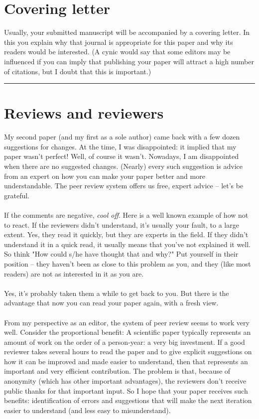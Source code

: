 \documentclass[a4paper,12pt]{article}
\begin{document}
\section{Covering letter}
Usually, your submitted manuscript will be accompanied by a covering letter. In this you explain why that journal is appropriate for this paper and why its readers would be interested. (A cynic would say that some editors may be influenced if you can imply that publishing your paper will attract a high number of citations, but I doubt that this is important.)
\noindent\rule{\textwidth}{1pt}
\section{Reviews and reviewers} 
 My second paper (and my first as a sole author) came back with a few dozen suggestions for changes. At the time, I was disappointed: it implied that my paper wasn’t perfect! Well, of course it wasn’t. Nowadays, I am disappointed  when there are no suggested changes. (Nearly) every such suggestion is advice from an expert on how you can make your paper better and more understandable. The peer review system offers us free, expert advice – let's be grateful.\\\\If the comments are negative, \textit{cool off}. Here is a well known example of how not to react. If the reviewers didn't understand, it's usually your fault, to a large extent. Yes, they read it quickly, but they are experts in the field. If they didn't understand it in a quick read, it usually means that you've not explained it well. So think "How could s/he have thought that and why?" Put yourself in their position – they haven't been as close to this problem as you, and they (like most readers) are not as interested in it as you are.\\\\Yes, it’s probably taken them a while to get back to you. But there is the advantage that now you can read your paper again, with a fresh view.\\\\From my perspective as an editor, the system of peer review seems to work very well. Consider the proportional benefit: A scientific paper typically represents an amount of work on the order of a person-year: a very big investment. If a good reviewer takes several hours to read the paper and to give explicit suggestions on how it can be improved and made easier to understand, then that represents an important and very efficient contribution. The problem is that, because of anonymity (which has other important advantages), the reviewers don't receive public thanks for that important input. So I hope that your paper receives such benefits: identification of errors and suggestions that will make the next iteration easier to understand (and less easy to misunderstand). 
\end{document}
